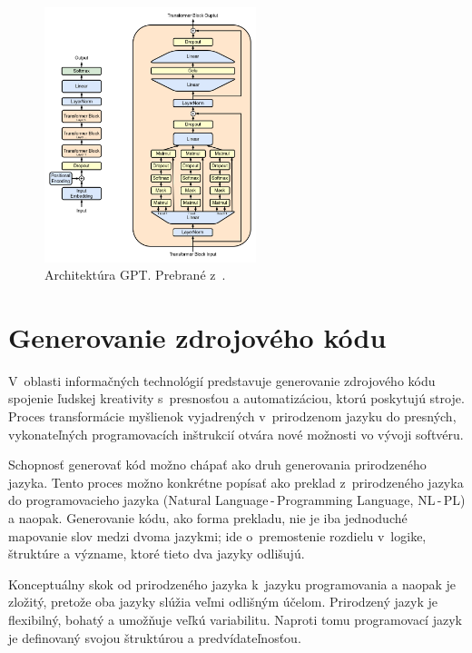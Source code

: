 \begin{figure}
    \centering
    \includegraphics[width=0.55\textwidth]{obrazky/Full_GPT_architecture.png}
    \caption{Architektúra GPT. Prebrané z~\cite{gptarchitecture}.}
    \label{fig:GPT-architecture}
\end{figure}

\section{Generovanie zdrojového kódu}\label{sec:code_gen}

V~oblasti informačných technológií predstavuje generovanie zdrojového kódu spojenie ľudskej kreativity s~presnosťou a automatizáciou, ktorú poskytujú stroje. Proces transformácie myšlienok vyjadrených v~prirodzenom jazyku do presných, vykonateľných programovacích inštrukcií otvára nové možnosti vo vývoji softvéru. 

Schopnosť generovať kód možno chápať ako druh generovania prirodzeného jazyka. Tento proces možno konkrétne popísať ako preklad z~prirodzeného jazyka do programovacieho jazyka (Natural Language\,-\,Programming Language, NL\,-\,PL) a naopak. Generovanie kódu, ako forma prekladu, nie je iba jednoduché mapovanie slov medzi dvoma jazykmi; ide o~premostenie rozdielu v~logike, štruktúre a význame, ktoré tieto dva jazyky odlišujú.

Konceptuálny skok od prirodzeného jazyka k~jazyku programovania a naopak je zložitý, pretože oba jazyky slúžia veľmi odlišným účelom. Prirodzený jazyk je flexibilný, bohatý a umožňuje veľkú variabilitu. Naproti tomu programovací jazyk je definovaný svojou štruktúrou a predvídateľnosťou.

